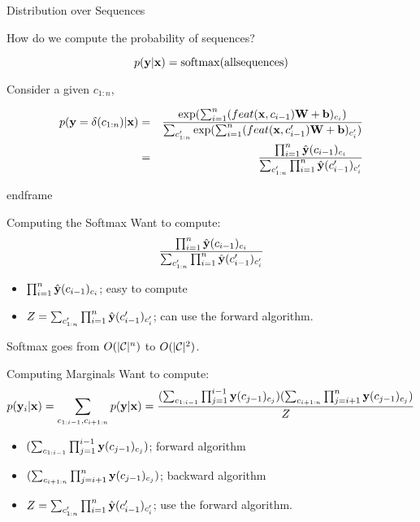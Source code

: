 \documentclass{beamer}
\begin{document}
\begin{frame}{Distribution over Sequences}

  How do we compute the probability of sequences?

    \[ p(\boldy | \boldx ) =  \softmax(\mathrm{all sequences})    \] 

  Consider a given $c_{1:n}$, 

  \begin{eqnarray*}
    p(\mathbf{y}=\delta(c_{1:n}) | \mathbf{x} ) &=& \displaystyle \frac{\exp(\sum_{i=1}^n (feat(\mathbf{x}, c_{i-1}) \mathbf{W} + \mathbf{b})_{c_i})}{\sum_{c'_{1:n}} \exp(\sum_{i=1}^n (feat(\mathbf{x}, c'_{i-1}) \mathbf{W} + \mathbf{b})_{c'_i}) }  \\       
    &=& \frac{\prod_{i=1}^n \hat{\mathbf{y}}(c_{i-1})_{c_i}} { \sum_{c'_{1:n}} \prod_{i=1}^n \hat{\mathbf{y}}(c'_{i-1})_{c'_i} }
  \end{eqnarray*}
    
 end{frame}


 \begin{frame}{Computing the Softmax}
   Want to compute:
   \[ \frac{\prod_{i=1}^n \hat{\mathbf{y}}(c_{i-1})_{c_i}} { \sum_{c'_{1:n}} \prod_{i=1}^n \hat{\mathbf{y}}(c'_{i-1})_{c'_i} }\] 

   \begin{itemize}
   \item $\prod_{i=1}^n \hat{\mathbf{y}}(c_{i-1})_{c_i}$; easy to compute
     \air 
   \item $Z = \sum_{c'_{1:n}} \prod_{i=1}^n \hat{\mathbf{y}}(c'_{i-1})_{c'_i}$; can use the forward algorithm.
   \end{itemize}

   Softmax goes from $O(|\mathcal{C}|^n)$ to $O(|\mathcal{C}|^2)$.  
 \end{frame}


 \begin{frame}{Computing Marginals}
   Want to compute:
   \[ p(\mathbf{y}_i | \mathbf{x}) = \sum_{c_{1:i-1}, c_{i+1:n}} p(\mathbf{y} | \mathbf{x})  = \frac{(\sum_{c_{1:i-1}} \prod_{j=1}^{i-1} \mathbf{y}(c_{j-1})_{c_j} ) (\sum_{c_{i+1:n}} \prod_{j=i+1}^{n} \mathbf{y}(c_{j-1})_{c_j} )   }{Z}  \] 

   \begin{itemize}
   \item $(\sum_{c_{1:i-1}} \prod_{j=1}^{i-1} \mathbf{y}(c_{j-1})_{c_j} )$; forward algorithm
     \air 
   \item $(\sum_{c_{i+1:n}} \prod_{j=i+1}^{n} \mathbf{y}(c_{j-1})_{c_j} )$; backward algorithm
   \item $Z = \sum_{c'_{1:n}} \prod_{i=1}^n \hat{\mathbf{y}}(c'_{i-1})_{c'_i}$; use the forward algorithm.
   \end{itemize}
 \end{frame}



\end{frame}
\end{document}
